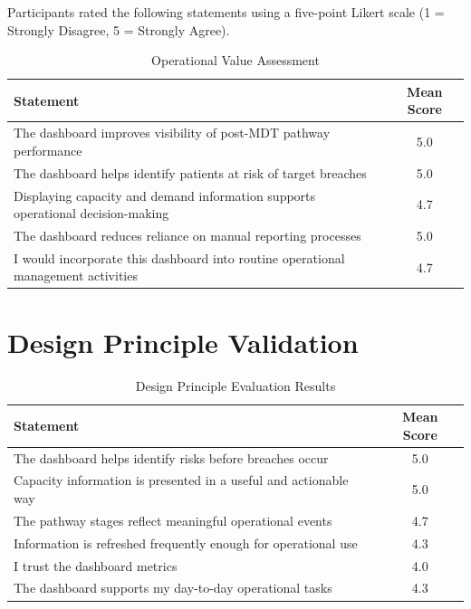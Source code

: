 Participants rated the following statements using a five-point Likert scale (1 = Strongly Disagree, 5 = Strongly Agree). 

\begin{table}[h] 
    \centering 
    \begin{tabular}{|p{9cm}|c|} 
        \hline 
        \textbf{Statement} & \textbf{Mean Score} \\
        \hline\hline
        The dashboard improves visibility of post-MDT pathway performance & 5.0 \\
        The dashboard helps identify patients at risk of target breaches & 5.0 \\ 
        Displaying capacity and demand information supports operational decision-making & 4.7 \\ 
        The dashboard reduces reliance on manual reporting processes & 5.0 \\ 
        I would incorporate this dashboard into routine operational management activities & 4.7 \\ 
        \hline 
    \end{tabular} 
    \caption{Operational Value Assessment} 
\end{table}


\section{Design Principle Validation} 

\begin{table}[H]
    \centering 
    \begin{tabular}{|p{9cm}|c|} 
        \hline 
        \textbf{Statement} & \textbf{Mean Score} \\ 
        \hline\hline
        The dashboard helps identify risks before breaches occur & 5.0 \\ 
        Capacity information is presented in a useful and actionable way & 5.0 \\ 
        The pathway stages reflect meaningful operational events & 4.7 \\ 
        Information is refreshed frequently enough for operational use & 4.3 \\ 
        I trust the dashboard metrics & 4.0 \\ 
        The dashboard supports my day-to-day operational tasks & 4.3 \\ 
        \hline 
    \end{tabular} 
    \caption{Design Principle Evaluation Results} 
\end{table}
\clearpage
